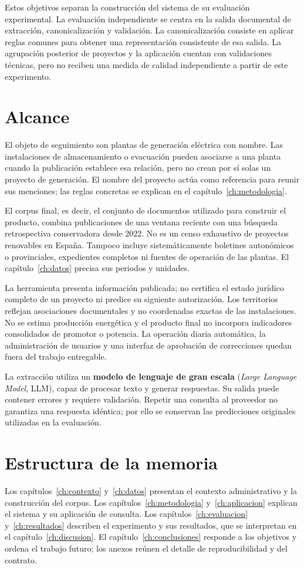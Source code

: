 Estos objetivos separan la construcción del sistema de su evaluación
experimental. La evaluación independiente se centra en la salida documental
de extracción, canonicalización y validación. La canonicalización consiste
en aplicar reglas comunes para obtener una representación consistente de
esa salida. La agrupación posterior de proyectos y la aplicación cuentan con
validaciones técnicas, pero no reciben una medida de calidad independiente
a partir de este experimento.

\section{Alcance}
El objeto de seguimiento son plantas de generación eléctrica con nombre. Las
instalaciones de almacenamiento o evacuación pueden asociarse a una planta
cuando la publicación establece esa relación, pero no crean por sí solas un
proyecto de generación. El nombre del proyecto actúa como referencia para
reunir sus menciones; las reglas concretas se explican en el
capítulo~\ref{ch:metodologia}.

El corpus final, es decir, el conjunto de documentos utilizado para construir
el producto, combina publicaciones de una ventana reciente con una búsqueda
retrospectiva conservadora desde 2022. No es un censo exhaustivo de proyectos
renovables en España. Tampoco incluye sistemáticamente boletines autonómicos
o provinciales, expedientes completos ni fuentes de operación de las plantas.
El capítulo~\ref{ch:datos} precisa sus periodos y unidades.

La herramienta presenta información publicada; no certifica el estado
jurídico completo de un proyecto ni predice su siguiente autorización.
Los territorios reflejan asociaciones documentales y no coordenadas exactas
de las instalaciones. No se estima producción energética y el producto final
no incorpora indicadores consolidados de promotor o potencia. La operación
diaria automática, la administración de usuarios y una interfaz de aprobación
de correcciones quedan fuera del trabajo entregable.

La extracción utiliza un \textbf{modelo de lenguaje de gran escala}
(\textit{Large Language Model}, LLM), capaz de procesar texto y generar
respuestas. Su salida puede contener errores y requiere validación. Repetir
una consulta al proveedor no garantiza una respuesta idéntica; por ello se
conservan las predicciones originales utilizadas en la evaluación.

\section{Estructura de la memoria}
Los capítulos~\ref{ch:contexto} y~\ref{ch:datos} presentan el contexto
administrativo y la construcción del corpus. Los
capítulos~\ref{ch:metodologia} y~\ref{ch:aplicacion} explican el sistema y su
aplicación de consulta. Los capítulos~\ref{ch:evaluacion}
y~\ref{ch:resultados} describen el experimento y sus resultados, que se
interpretan en el capítulo~\ref{ch:discusion}. El
capítulo~\ref{ch:conclusiones} responde a los objetivos y ordena el trabajo
futuro; los anexos reúnen el detalle de reproducibilidad y del contrato.
